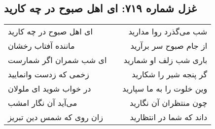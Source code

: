 \begin{center}
\section*{غزل شماره ۷۱۹: ای اهل صبوح در چه کارید}
\label{sec:0719}
\begin{longtable}{l p{0.5cm} r}
ای اهل صبوح در چه کارید
&&
شب می‌گذرد روا مدارید
\\
ماننده آفتاب رخشان
&&
از جام صبوح سر برآرید
\\
ای شب شمران اگر شمارست
&&
باری شب زلف او شمارید
\\
زخمی که زدست وانمایید
&&
گر پنجه شیر را شکارید
\\
در خواب شوید ای ملولان
&&
وین خلوت را به ما سپارید
\\
می‌آید آن نگار امشب
&&
چون منتظران آن نگارید
\\
زان روی که شمس دین تبریز
&&
داند که شما در انتظارید
\\
\end{longtable}
\end{center}
